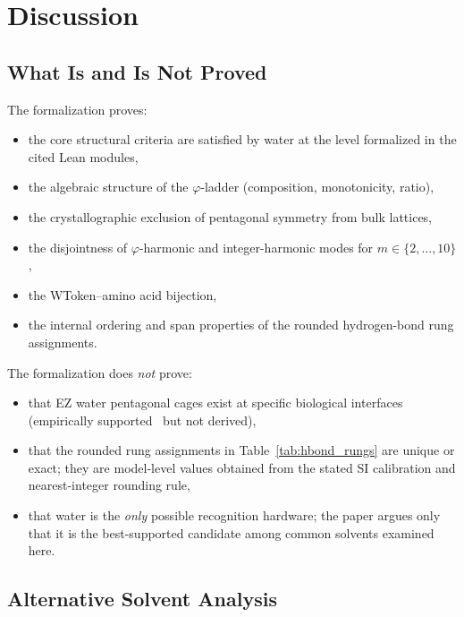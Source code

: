 \documentclass[12pt,a4paper]{article}
\theoremstyle{definition}
\theoremstyle{remark}
\begin{document}
\section{Discussion}
\label{sec:discussion}

\subsection{What Is and Is Not Proved}

The formalization proves:
\begin{itemize}[nosep]
  \item the core structural criteria are satisfied by water at the level
  formalized in the cited Lean modules,
  \item the algebraic structure of the $\varphi$-ladder (composition,
  monotonicity, ratio),
  \item the crystallographic exclusion of pentagonal symmetry from bulk
  lattices,
  \item the disjointness of $\varphi$-harmonic and integer-harmonic
  modes for $m \in \{2, \ldots, 10\}$,
  \item the WToken--amino acid bijection,
  \item the internal ordering and span properties of the rounded
  hydrogen-bond rung assignments.
\end{itemize}

The formalization does \emph{not} prove:
\begin{itemize}[nosep]
  \item that EZ water pentagonal cages exist at specific biological
  interfaces (empirically supported~\cite{Pollack2013} but not derived),
  \item that the rounded rung assignments in Table~\ref{tab:hbond_rungs}
  are unique or exact; they are model-level values obtained from the
  stated SI calibration and nearest-integer rounding rule,
  \item that water is the \emph{only} possible recognition hardware;
  the paper argues only that it is the best-supported candidate among
  common solvents examined here.
\end{itemize}

\subsection{Alternative Solvent Analysis}
\end{document}
